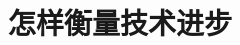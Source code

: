 \documentclass{article}
\begin{document}
\section{怎样衡量技术进步}




































































	
\end{document}
